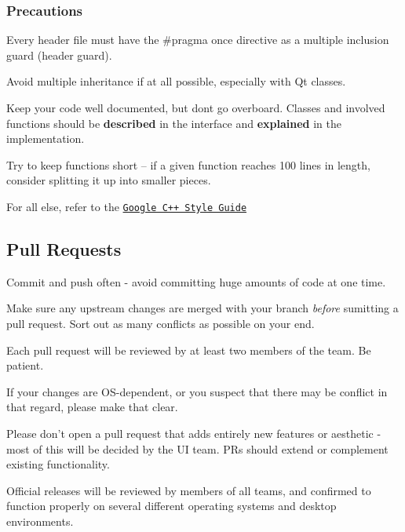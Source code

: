 \subsubsection*{Precautions}


\begin{DoxyItemize}
\item Every header file must have the \#pragma once directive as a multiple inclusion guard (header guard).
\item Avoid multiple inheritance if at all possible, especially with Qt classes.
\item Keep your code well documented, but don\textquotesingle{}t go overboard. Classes and involved functions should be {\bfseries described} in the interface and {\bfseries explained} in the implementation.
\item Try to keep functions short -- if a given function reaches 100 lines in length, consider splitting it up into smaller pieces.
\item For all else, refer to the \href{https://google-styleguide.googlecode.com/svn/trunk/cppguide.html}{\tt Google C++ Style Guide}
\end{DoxyItemize}

\subsection*{Pull Requests}


\begin{DoxyItemize}
\item Commit and push often -\/ avoid committing huge amounts of code at one time.
\item Make sure any upstream changes are merged with your branch {\itshape before} sumitting a pull request. Sort out as many conflicts as possible on your end.
\item Each pull request will be reviewed by at least two members of the team. Be patient.
\begin{DoxyItemize}
\item If your changes are O\+S-\/dependent, or you suspect that there may be conflict in that regard, please make that clear.
\item Please don’t open a pull request that adds entirely new features or aesthetic -\/ most of this will be decided by the U\+I team. P\+Rs should extend or complement existing functionality.
\end{DoxyItemize}
\item Official releases will be reviewed by members of all teams, and confirmed to function properly on several different operating systems and desktop environments.
\end{DoxyItemize}

